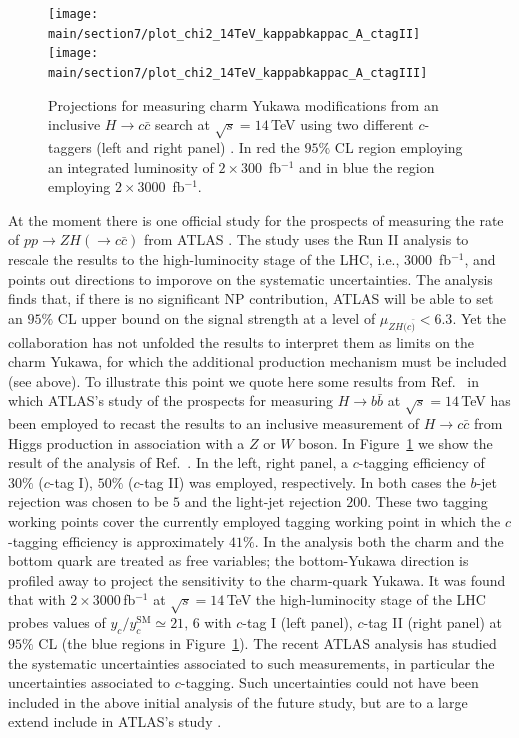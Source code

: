 \documentclass[../report.tex]{subfiles}
\providecommand{\main}{..}
\begin{document}
\begin{figure}[]
	\centering
	\texttt{[image: \\main/section7/plot\_chi2\_14TeV\_kappabkappac\_A\_ctagII]}
	\texttt{[image: \\main/section7/plot\_chi2\_14TeV\_kappabkappac\_A\_ctagIII]}
	\caption{Projections for measuring charm Yukawa modifications from an inclusive 
		$H\to c\bar c$ search at $\sqrt{s}=14$\,TeV using two different 
		$c$-taggers (left and right panel) \cite{Perez:2015lra}.
		In red the $95\%$ CL region employing an integrated luminosity 
		of $2\times 300$~fb$^{-1}$ and in blue the region 
		employing $2\times 3000$~fb$^{-1}$.
	\label{fig:inclusiveforecast}}
\end{figure}

At the moment there is one official study for the prospects of measuring 
the rate of $pp\to ZH(\to c\bar c)$ from ATLAS \cite{ATL-PHYS-PUB-2018-016}.
The study uses the Run II analysis \cite{Aaboud:2018fhh} to rescale the results 
to the high-luminocity stage of the LHC, i.e., $3000$~fb$^{-1}$, and 
points out directions to imporove on the systematic uncertainties.
The analysis finds that, if there is no significant NP contribution, 
ATLAS will be able to set an $95\%$ CL upper bound on the signal strength 
at a level of $\mu_{ZH(c\bar)} <6.3$.
Yet the collaboration has not unfolded the results to interpret them as 
limits on the charm Yukawa,
for which the additional production mechanism must be included (see above).
To illustrate this point we quote here some results from Ref.~\cite{Perez:2015lra}
in which ATLAS's study of the prospects for measuring $H\to b\bar b$ at $\sqrt{s}=14$\,TeV 
\cite{ATLAS-collaboration:2012iza} has been employed to recast 
the results to an inclusive measurement of $H\to c \bar c$ from Higgs production in 
association with a $Z$ or $W$ boson.
In Figure~\ref{fig:inclusiveforecast} we show the result of the analysis of Ref.~\cite{Perez:2015lra}.
In the left, right panel, a $c$-tagging efficiency of $30\%$ ($c$-tag I), $50\%$ ($c$-tag II) 
was employed, respectively. 
In both cases the $b$-jet rejection was chosen to be $5$ and the light-jet rejection
$200$.
These two tagging working points cover the currently employed tagging working point in which
the $c$-tagging efficiency is approximately $41\%$.
In the analysis both the charm and the bottom quark are treated as free variables;
the bottom-Yukawa direction is profiled away to project the sensitivity to the 
charm-quark Yukawa.
It was found that with $2\times 3000$\,fb$^{-1}$ at $\sqrt{s}=14$\,TeV the 
high-luminocity stage of the LHC probes values of $y_c/y_c^{\text{SM}}\simeq 21,\,6$ with
$c$-tag I (left panel), $c$-tag II (right panel) at $95\%$ CL 
(the blue regions in Figure~\ref{fig:inclusiveforecast}).
The recent ATLAS analysis has studied the systematic uncertainties associated 
to such measurements, in particular the uncertainties associated to $c$-tagging.
Such uncertainties could not have been included in the above initial analysis of
the future study, but are to a large extend include in ATLAS's study \cite{ATL-PHYS-PUB-2018-016}.
\end{document}
